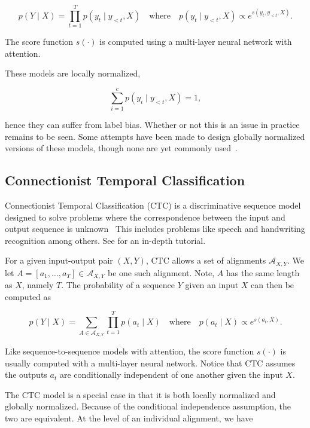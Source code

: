 \documentclass[11pt, letterpaper]{article}
\newcommand{\A}{\mathcal{A}}
\begin{document}
\begin{equation}
    p(Y \mid X) = \prod_{t=1}^T p(y_t \mid y_{<t}, X)
      \quad \textrm{where} \quad p(y_t \mid y_{<t}, X) \propto e^{s(y_t, y_{<t}, X)}.
\end{equation}

The score function $s(\cdot)$ is computed using a multi-layer neural network
with attention.

These models are locally normalized,

\begin{equation}
\sum_{i=1}^c p(y_i \mid y_{<t}, X) = 1,
\end{equation}

hence they can suffer from label bias. Whether or not this is an issue in
practice remains to be seen. Some attempts have been made to design globally
normalized versions of these models, though none are yet commonly
used~\citep{wiseman2016}.

\subsection{Connectionist Temporal Classification}

Connectionist Temporal Classification (CTC) is a discriminative sequence model
designed to solve problems where the correspondence between the input and
output sequence is unknown~\citep{graves2006} This includes problems like speech
and handwriting recognition among others. See \citet{hannun2017} for an
in-depth tutorial.

For a given input-output pair $(X, Y)$, CTC allows a set of alignments
$\A_{X,Y}$. We let $A\!=\![a_1, \ldots, a_T] \in \A_{X,Y}$ be one such alignment.
Note, $A$ has the same length as $X$, namely $T$. The probability of a sequence
$Y$ given an input $X$ can then be computed as

\begin{equation}
    p(Y \mid X) = \sum_{A \in \A_{X,Y}} \prod_{t=1}^T p(a_t \mid X)
     \quad \textrm{where} \quad p(a_t \mid X) \propto e^{s(a_t, X)}.
\end{equation}

Like sequence-to-sequence models with attention, the score function $s(\cdot)$
is usually computed with a multi-layer neural network. Notice that CTC assumes
the outputs $a_t$ are conditionally independent of one another given the input
$X$.

The CTC model is a special case in that it is both locally normalized and
globally normalized. Because of the conditional independence assumption, the
two are equivalent. At the level of an individual alignment, we have
\end{document}
